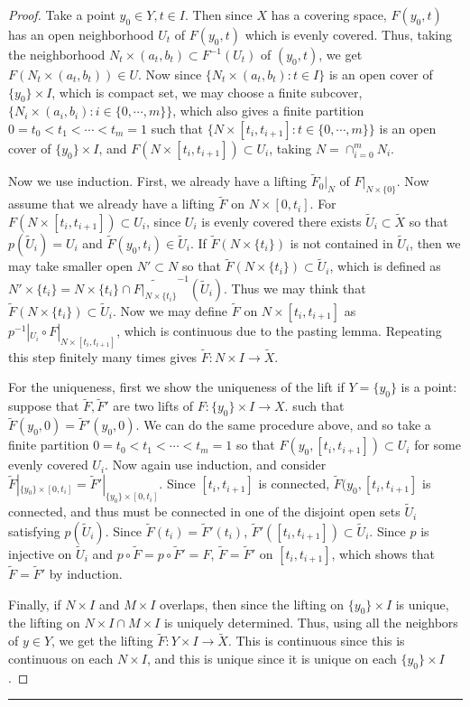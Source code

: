 \begin{proof} Take a point $y_0\in Y, t\in I$. Then since $X$ has a covering space, $F(y_0,t)$ has an open neighborhood $U_{t}$ of $F(y_0,t)$ which is evenly covered. Thus, taking the neighborhood $N_t\times (a_t,b_t)\subset F^{-1}(U_t)$ of $(y_0,t)$, we get $F(N_t\times (a_t,b_t))\in U$. Now since $\{N_t\times (a_t,b_t):t\in I\}$ is an open cover of $\{y_0\}\times I$, which is compact set, we may choose a finite subcover, $\{N_i\times (a_i,b_i):i\in \{0,\cdots,m\}\}$, which also gives a finite partition $0=t_0<t_1<\cdots<t_m=1$ such that $\{N\times [t_i,t_{i+1}]:t\in\{0,\cdots,m\}\}$ is an open cover of $\{y_0\}\times I$, and $F(N\times [t_i,t_{i+1}])\subset U_i$, taking $N=\cap_{i=0}^m N_i$.

Now we use induction. First, we already have a lifting $\tilde{F}_0|_N$ of $F|_{N\times \{0\}}$. Now assume that we already have a lifting $\tilde{F}$ on $N\times [0,t_{i}]$. For $F(N\times [t_i,t_{i+1}])\subset U_i$, since $U_i$ is evenly covered there exists $\tilde{U}_i\subset \tilde{X}$ so that $p(\tilde{U}_i)=U_i$ and $\tilde{F}(y_0,t_i)\in \tilde{U}_i$. If $\tilde{F}(N\times \{t_i\})$ is not contained in $\tilde{U}_i$, then we may take smaller open $N'\subset N$ so that $\tilde{F}(N\times \{t_i\})\subset \tilde{U}_i$, which is defined as $N'\times \{t_i\}=N\times \{t_i\}\cap \tilde{F|_{N\times \{t_i\}}}^{-1}(\tilde{U}_i)$. Thus we may think that $\tilde{F}(N\times \{t_i\})\subset \tilde{U}_i$. Now we may define $\tilde{F}$ on $N\times [t_i,t_{i+1}]$ as $p^{-1}|_{U_i}\circ F|_{N\times [t_i,t_{i+1}]}$, which is continuous due to the pasting lemma. Repeating this step finitely many times gives $\tilde{F}:N\times I\rightarrow \tilde{X}$.

For the uniqueness, first we show the uniqueness of the lift if $Y=\{y_0\}$ is a point: suppose that $\tilde{F},\tilde{F}'$ are two lifts of $F:\{y_0\}\times I\rightarrow X$. such that $\tilde{F}(y_0,0)=\tilde{F}'(y_0,0)$. We can do the same procedure above, and so take a finite partition $0=t_0<t_1<\cdots<t_m=1$ so that $F(y_0,[t_i,t_{i+1}])\subset U_i$ for some evenly covered $U_i$. Now again use induction, and consider $\tilde{F}|_{\{y_0\}\times [0,t_i]}=\tilde{F}'|_{\{y_0\}\times [0,t_i]}$. Since $[t_i,t_{i+1}]$ is connected, $\tilde{F}(y_0,[t_i,t_{i+1}]$ is connected, and thus must be connected in one of the disjoint open sets $\tilde{U}_i$ satisfying $p(\tilde{U}_i)$. Since $\tilde{F}(t_i)=\tilde{F}'(t_i)$, $\tilde{F}'([t_i,t_{i+1}])\subset \tilde{U}_i$. Since $p$ is injective on $\tilde{U}_i$ and $p\circ \tilde{F}=p\circ \tilde{F}'=F$, $\tilde{F}=\tilde{F}'$ on $[t_i,t_{i+1}]$, which shows that $\tilde{F}=\tilde{F}'$ by induction.

Finally, if $N\times I$ and $M\times I$ overlaps, then since the lifting on $\{y_0\}\times I$ is unique, the lifting on $N\times I\cap M\times I$ is uniquely determined. Thus, using all the neighbors of $y\in Y$, we get the lifting $\tilde{F}:Y\times I\rightarrow \tilde{X}$. This is continuous since this is continuous on each $N\times I$, and this is unique since it is unique on each $\{y_0\}\times I$.
\end{proof}

\noindent\rule{\textwidth}{1pt}
\newline